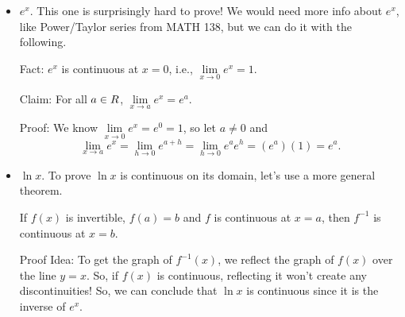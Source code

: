 \begin{itemize}
    \item $ e^x $. This one is surprisingly hard to prove! We would need more info about $ e^x $, like Power/Taylor series from MATH 138, but we can
          do it with the following.

          Fact: $ e^x $ is continuous at $ x=0 $, i.e., $ \lim\limits_{{x} \to {0}}e^x=1 $.

          Claim: For all $ a\in\relax{R} $, $ \lim\limits_{{x} \to {a}}e^x=e^a $.

          Proof: We know $ \lim\limits_{{x} \to {0}}e^x=e^0=1 $, so let $ a\ne 0 $ and
          \[ \lim\limits_{{x} \to {a}}e^x=\lim\limits_{{h} \to {0}}e^{a+h}=\lim\limits_{{h} \to {0}}e^a e^h=(e^a)(1)=e^a. \]
    \item $ \ln x $. To prove $ \ln x $ is continuous on its domain, let's use a more general theorem.
          \begin{Theorem}{}{}
              If $ f(x) $ is invertible, $ f(a)=b $ and $ f $ is continuous at $ x=a $, then $ f^{-1} $ is continuous at $ x=b $.
          \end{Theorem}
          Proof Idea: To get the graph of $ f^{-1}(x) $, we reflect the graph of $ f(x) $ over the line $ y=x $. So,
          if $ f(x) $ is continuous, reflecting it won't create any discontinuities! So, we can conclude that $ \ln x $ is continuous
          since it is the inverse of $ e^x $.
\end{itemize}
